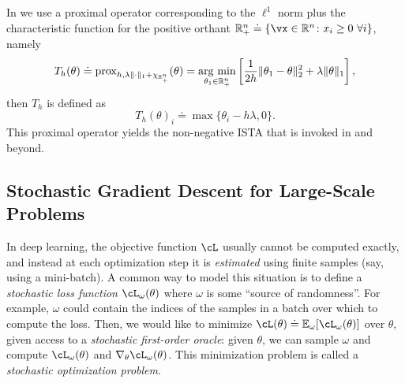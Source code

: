 \documentclass[../../book-main.tex]{subfiles}
\begin{document}
\begin{example}\label{example:prox-of-nonnegative-l1}
    In  we use a proximal operator corresponding to the \(\ell^{1}\) norm plus the characteristic function for the positive orthant \(\R_{+}^{n} \doteq \{\vx \in \R^{n} \colon x_{i} \geq 0\ \forall i\}\), namely
    \begin{equation}
        T_{h}(\theta) \doteq \prox_{h, \lambda\norm{\cdot}_{1} + \chi_{\R_{+}^{n}}}(\theta) = \argmin_{\theta_{1} \in \R_{+}^{n}}\bs{\frac{1}{2h}\norm{\theta_{1} - \theta}_{2}^{2} + \lambda\norm{\theta}_{1}},
    \end{equation}
    then \(T_{h}\) is defined as 
    \begin{equation}
        T_{h}(\theta)_{i} \doteq \max\{\theta_{i} - h\lambda, 0\}.
    \end{equation}
    This proximal operator yields the non-negative ISTA that is invoked in  and beyond.
\end{example}



\subsection{Stochastic Gradient Descent for Large-Scale Problems}


In deep learning, the objective function \(\cL\) usually cannot be computed exactly, and instead at each optimization step it is \textit{estimated} using finite samples (say, using a mini-batch). A common way to model this situation is to define a \textit{stochastic loss function} \(\cL_{\omega}(\theta)\) where \(\omega\) is some ``source of randomness''. For example, \(\omega\) could contain the indices of the samples in a batch over which to compute the loss. Then, we would like to minimize \(\cL(\theta) \doteq \Ex_{\omega}[\cL_{\omega}(\theta)]\) over \(\theta\), given access to a \textit{stochastic first-order oracle}: given \(\theta\), we can sample \(\omega\) and compute \(\cL_{\omega}(\theta)\) and \(\nabla_{\theta}\cL_{\omega}(\theta)\). This minimization problem is called a \textit{stochastic optimization problem}.
\end{document}

